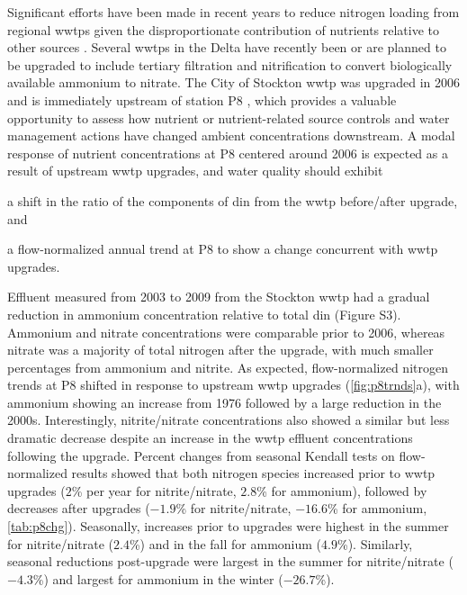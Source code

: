 \documentclass[journal = esthag, manuscript = article]{achemso}\usepackage[]{graphicx}\usepackage[]{color}
\begin{document}
Significant efforts have been made in recent years to reduce nitrogen loading from regional \acp{wwtp} given the disproportionate contribution of nutrients relative to other sources \cite{Cornwell14,Novick15}.  Several \acp{wwtp} in the Delta have recently been or are planned to be upgraded to include tertiary filtration and nitrification to convert biologically available ammonium to nitrate. The City of Stockton \ac{wwtp} was upgraded in 2006 and is immediately upstream of station P8 \cite{Jabusch16}, which provides a valuable opportunity to assess how nutrient or nutrient-related source controls and water management actions have changed ambient concentrations downstream. A modal response of nutrient concentrations at P8 centered around 2006 is expected as a result of upstream \ac{wwtp} upgrades, and water quality should exhibit \begin{inparaenum}[1\upshape)]
\item a shift in the ratio of the components of \ac{din} from the \ac{wwtp} before/after upgrade, and
\item a flow-normalized annual trend at P8 to show a change concurrent with \ac{wwtp} upgrades.
\end{inparaenum}



Effluent measured from 2003 to 2009 from the Stockton \ac{wwtp} had a gradual reduction in ammonium concentration relative to total \ac{din} (Figure S3).  Ammonium and nitrate concentrations were comparable prior to 2006, whereas nitrate was a majority of total nitrogen after the upgrade, with much smaller percentages from ammonium and nitrite. As expected, flow-normalized nitrogen trends at P8 shifted in response to upstream \ac{wwtp} upgrades (\cref{fig:p8trnds}a), with ammonium showing an increase from 1976 followed by a large reduction in the 2000s.  Interestingly, nitrite/nitrate concentrations also showed a similar but less dramatic decrease despite an increase in the \ac{wwtp} effluent concentrations following the upgrade.  Percent changes from seasonal Kendall tests on flow-normalized results showed that both nitrogen species increased prior to \ac{wwtp} upgrades ($2$\% per year for nitrite/nitrate, $2.8$\% for ammonium), followed by decreases after upgrades ($-1.9$\% for nitrite/nitrate, $-16.6$\% for ammonium, \cref{tab:p8chg}).  Seasonally, increases prior to upgrades were highest in the summer for nitrite/nitrate ($2.4$\%) and in the fall for ammonium ($4.9$\%). Similarly, seasonal reductions post-upgrade were largest in the summer for nitrite/nitrate ($-4.3$\%) and largest for ammonium in the winter ($-26.7$\%).
\end{document}
